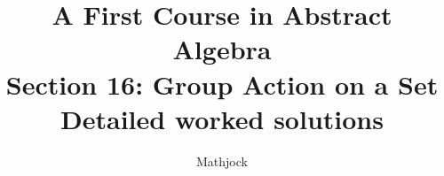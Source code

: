 
\title{\textbf{A First Course in Abstract Algebra}\\[0.3em]Section 16: Group Action on a Set\\[0.3em]\large Detailed worked solutions}
\author{Mathjock}
\date{}

\maketitle
\bookinfo
\tableofcontents
\clearpage
\renewcommand{\thesection}{16}
\renewcommand{\theHsection}{fraleigh.16}



